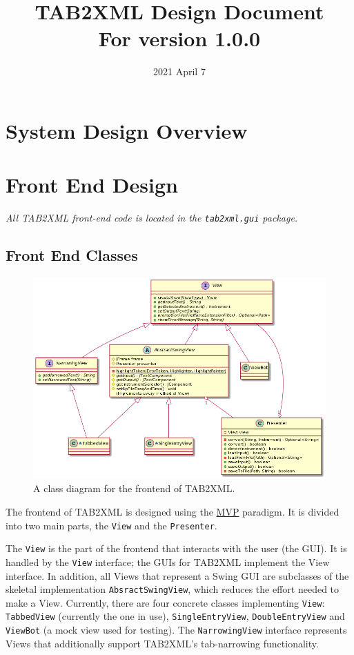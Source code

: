 \documentclass[11pt]{article}
\date{2021 April 7}
\title{TAB2XML Design Document\\\medskip
\large For version 1.0.0}
\begin{document}
\maketitle
\tableofcontents

\newpage

\section{System Design Overview}
\label{sec:orgbd7c26f}

\section{Front End Design}
\label{sec:org664b49f}
\emph{All TAB2XML front-end code is located in the \texttt{tab2xml.gui} package.}
\subsection{Front End Classes}
\label{sec:org6b287fb}
\begin{figure}[htbp]
\centering
\includegraphics[width=.9\linewidth]{./Diagrams/frontend-class-diagram.png}
\caption{A class diagram for the frontend of TAB2XML.}
\end{figure}

The frontend of TAB2XML is designed using the \href{https://en.wikipedia.org/wiki/Model\%E2\%80\%93view\%E2\%80\%93presenter}{MVP} paradigm.  It is divided into two main parts, the \texttt{View} and the \texttt{Presenter}.

The \texttt{View} is the part of the frontend that interacts with the user (the GUI).  It is handled by the \texttt{View} interface; the GUIs for TAB2XML implement the View interface.  In addition, all Views that represent a Swing GUI are subclasses of the skeletal implementation \texttt{AbsractSwingView}, which reduces the effort needed to make a View.  Currently, there are four concrete classes implementing \texttt{View}: \texttt{TabbedView} (currently the one in use), \texttt{SingleEntryView}, \texttt{DoubleEntryView} and \texttt{ViewBot} (a mock view used for testing).  The \texttt{NarrowingView} interface represents Views that additionally support TAB2XML's tab-narrowing functionality.
\end{document}
